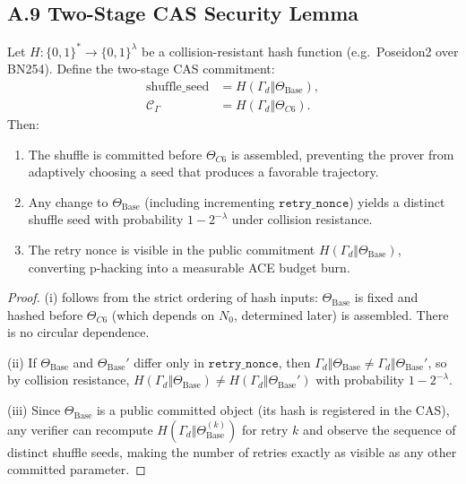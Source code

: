 \documentclass[11pt]{article}
\begin{document}
\subsection*{A.9 \quad Two-Stage CAS Security Lemma}

\begin{lemma}\label{lem:cas}
Let $H : \{0,1\}^* \to \{0,1\}^\lambda$ be a collision-resistant hash
function (e.g.\ Poseidon2 over BN254).  Define the two-stage CAS
commitment:
\begin{align*}
  \text{shuffle\_seed} &= H(\Gamma_d \Vert \Theta_{\text{Base}}), \\
  \mathcal{C}_\Gamma   &= H(\Gamma_d \Vert \Theta_{C6}).
\end{align*}
Then:
\begin{enumerate}[nosep,label=(\roman*)]
  \item The shuffle is committed before $\Theta_{C6}$ is assembled,
        preventing the prover from adaptively choosing a seed that
        produces a favorable trajectory.
  \item Any change to $\Theta_{\text{Base}}$ (including incrementing
        $\texttt{retry\_nonce}$) yields a distinct shuffle seed with
        probability $1 - 2^{-\lambda}$ under collision resistance.
  \item The retry nonce is visible in the public commitment
        $H(\Gamma_d \Vert \Theta_{\text{Base}})$, converting p-hacking
        into a measurable ACE budget burn.
\end{enumerate}
\end{lemma}

\begin{proof}
(i) follows from the strict ordering of hash inputs: $\Theta_{\text{Base}}$
is fixed and hashed before $\Theta_{C6}$ (which depends on $N_0$,
determined later) is assembled.  There is no circular dependence.

(ii) If $\Theta_{\text{Base}}$ and $\Theta_{\text{Base}}'$ differ only in
$\texttt{retry\_nonce}$, then $\Gamma_d \Vert \Theta_{\text{Base}} \ne
\Gamma_d \Vert \Theta_{\text{Base}}'$, so by collision resistance,
$H(\Gamma_d \Vert \Theta_{\text{Base}}) \ne H(\Gamma_d \Vert \Theta_{\text{Base}}')$
with probability $1 - 2^{-\lambda}$.

(iii) Since $\Theta_{\text{Base}}$ is a public committed object (its hash
is registered in the CAS), any verifier can recompute
$H(\Gamma_d \Vert \Theta_{\text{Base}}^{(k)})$ for retry $k$ and observe
the sequence of distinct shuffle seeds, making the number of retries
exactly as visible as any other committed parameter.
\end{proof}
\end{document}
